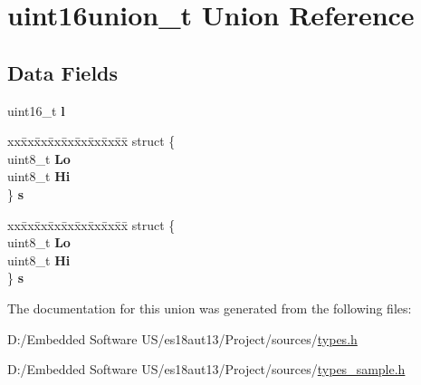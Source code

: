 \hypertarget{unionuint16union__t}{}\section{uint16union\+\_\+t Union Reference}
\label{unionuint16union__t}
\subsection*{Data Fields}
\begin{DoxyCompactItemize}
\item 
\hypertarget{unionuint16union__t_a99ee3a3f73300849c180c387230c7caa}{}uint16\+\_\+t {\bfseries l}\label{unionuint16union__t_a99ee3a3f73300849c180c387230c7caa}

\item 
\hypertarget{unionuint16union__t_a9cdec2144447742745bbe48155b96d92}{}\begin{tabbing}
xx\=xx\=xx\=xx\=xx\=xx\=xx\=xx\=xx\=\kill
struct \{\\
\>uint8\_t {\bfseries Lo}\\
\>uint8\_t {\bfseries Hi}\\
\} {\bfseries s}\label{unionuint16union__t_a9cdec2144447742745bbe48155b96d92}
\\

\end{tabbing}\item 
\hypertarget{unionuint16union__t_ad6b48420ba473d79b01b45b298ebd80d}{}\begin{tabbing}
xx\=xx\=xx\=xx\=xx\=xx\=xx\=xx\=xx\=\kill
struct \{\\
\>uint8\_t {\bfseries Lo}\\
\>uint8\_t {\bfseries Hi}\\
\} {\bfseries s}\label{unionuint16union__t_ad6b48420ba473d79b01b45b298ebd80d}
\\

\end{tabbing}\end{DoxyCompactItemize}


The documentation for this union was generated from the following files\+:\begin{DoxyCompactItemize}
\item 
D\+:/\+Embedded Software U\+S/es18aut13/\+Project/sources/\hyperlink{types_8h}{types.\+h}\item 
D\+:/\+Embedded Software U\+S/es18aut13/\+Project/sources/\hyperlink{types__sample_8h}{types\+\_\+sample.\+h}\end{DoxyCompactItemize}
